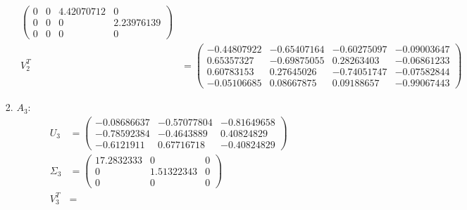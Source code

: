 \documentclass[conference,onecolumn]{IEEEtran}
\begin{document}
\begin{enumerate}[label=\arabic{enumi}.]
\begin{enumerate}
\begin{enumerate}
\begin{align*}
\begin{pmatrix}
                                      0          & 0          & 4.42070712 & 0          \\
                                      0          & 0          & 0          & 2.23976139 \\
                                      0          & 0          & 0          & 0
                                  \end{pmatrix} \\
                                  V_2^T    & =
                                  \begin{pmatrix}
                                      -0.44807922 & -0.65407164 & -0.60275097 & -0.09003647 \\
                                      0.65357327  & -0.69875055 & 0.28263403  & -0.06861233 \\
                                      0.60783153  & 0.27645026  & -0.74051747 & -0.07582844 \\
                                      -0.05106685 & 0.08667875  & 0.09188657  & -0.99067443
                                  \end{pmatrix}
                              \end{align*}
                        \item $A_3$:
                              \begin{align*}
                                  U_3      & =
                                  \begin{pmatrix}
                                      -0.08686637 & -0.57077804 & -0.81649658 \\
                                      -0.78592384 & -0.4643889  & 0.40824829  \\
                                      -0.6121911  & 0.67716718  & -0.40824829
                                  \end{pmatrix} \\
                                  \Sigma_3 & =
                                  \begin{pmatrix}
                                      17.2832333 & 0          & 0 \\
                                      0          & 1.51322343 & 0 \\
                                      0          & 0          & 0
                                  \end{pmatrix} \\
                                  V_3^T    & =

\end{align*}
\end{enumerate}
\end{enumerate}
\end{enumerate}
\end{document}
